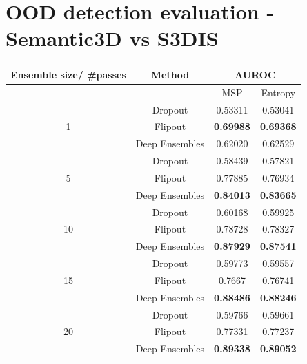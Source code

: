     \section{OOD detection evaluation - Semantic3D vs S3DIS}
    \begin{table}[h!]
        \centering
        \begin{tabular}{cccc}
        \hline
        Ensemble size/ \#passes & Method               &  \multicolumn{2}{c}{AUROC}          \\ \hline
                                &                      &  MSP              & Entropy         \\ \hline
        \multirow{3}{*}{1}      & Dropout              & 0.53311          & 0.53041          \\
                                & Flipout              & \textbf{0.69988} & \textbf{0.69368} \\
                                & Deep Ensembles       & 0.62020          & 0.62529          \\ \hline
        \multirow{3}{*}{5}      & Dropout              & 0.58439          & 0.57821          \\
                                & Flipout              & 0.77885          & 0.76934          \\
                                & Deep Ensembles       & \textbf{0.84013} & \textbf{0.83665} \\ \hline
        \multirow{3}{*}{10}     & Dropout              & 0.60168          & 0.59925          \\
                                & Flipout              & 0.78728          & 0.78327          \\
                                & Deep Ensembles       & \textbf{0.87929} & \textbf{0.87541} \\ \hline
        \multirow{3}{*}{15}     & Dropout              & 0.59773          & 0.59557          \\
                                & Flipout              & 0.7667           & 0.76741          \\
                                & Deep Ensembles       & \textbf{0.88486} & \textbf{0.88246} \\ \hline
        \multirow{3}{*}{20}     & Dropout              & 0.59766          & 0.59661          \\
                                & Flipout              & 0.77331          & 0.77237          \\
                                & Deep Ensembles       & \textbf{0.89338} & \textbf{0.89052} \\ \hline
        \end{tabular}
        \end{table}
    
